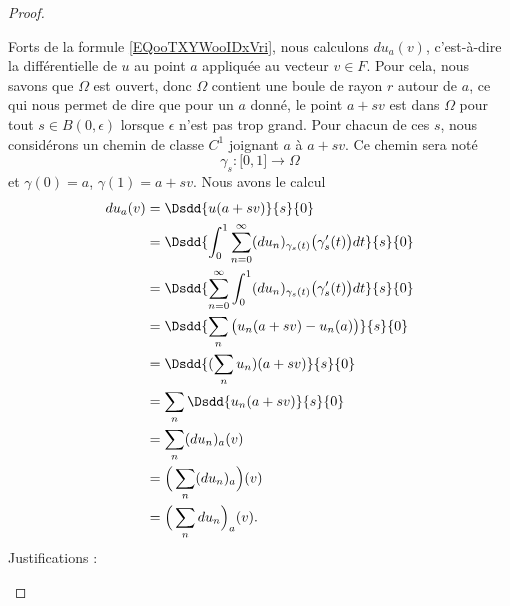 \begin{proof}
\begin{subproof}
		Forts de la formule \eqref{EQooTXYWooIDxVri}, nous calculons \( du_a(v)\), c'est-à-dire la différentielle de \( u\) au point \( a\) appliquée au vecteur \( v\in F\). Pour cela, nous savons que \( \Omega\) est ouvert, donc \( \Omega\) contient une boule de rayon \( r\) autour de \( a\), ce qui nous permet de dire que pour un \( a \) donné, le point \( a+sv\) est dans \( \Omega\) pour tout \( s\in B(0,\epsilon)\) lorsque \( \epsilon\) n'est pas trop grand. Pour chacun de ces \( s\), nous considérons un chemin de classe \( C^1\) joignant \( a\) à \( a+sv\). Ce chemin sera noté
		\begin{equation}
			\gamma_s\colon \mathopen[ 0 , 1 \mathclose]\to \Omega
		\end{equation}
		et \( \gamma(0)=a\), \( \gamma(1)=a+sv\). Nous avons le calcul
		\begin{subequations}
			\begin{align}
				du_a(v) & =\Dsdd{ u(a+sv) }{s}{0}                                                                                                    \\
				        & =\Dsdd{ \int_0^1\sum_{n=0}^{\infty}(du_n)_{\gamma_s(t)}\big( \gamma_s'(t) \big)dt }{s}{0}                                  \\
				        & =\Dsdd{ \sum_{n=0}^{\infty} \int_0^1(du_n)_{\gamma_s(t)}\big( \gamma'_s(t) \big)dt  }{s}{0}    \label{SUBEQooFSPSooCPErXj} \\
				        & =\Dsdd{ \sum_n\big( u_n(a+sv)-u_n(a) \big) }{s}{0}                                                                         \\
				        & =\Dsdd{ (\sum_nu_n)(a+sv) }{s}{0}                                                                                          \\
				        & =\sum_n\Dsdd{ u_n(a+sv) }{s}{0}    \label{SUBEQooDQODooIPMfDo}                                                             \\
				        & =\sum_n(du_n)_a(v)                                                                                                         \\
				        & =\Big( \sum_n(du_n)_a \Big)(v)                                                                                             \\
				        & =\Big( \sum_ndu_n \Big)_a(v)\label{SUBEQooQGOQooLvXuaX}.
			\end{align}
		\end{subequations}
		Justifications :
		\begin{itemize}

\end{itemize}
\end{subproof}
\end{proof}
